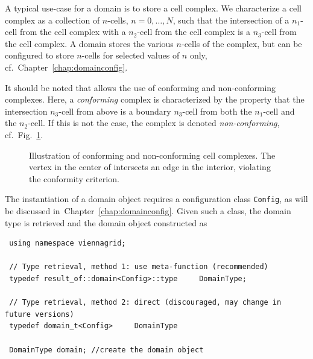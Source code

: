 A typical use-case for a domain is to store a cell complex. We characterize a cell complex as a collection of $n$-cells, $n=0, \ldots, N$, such that the intersection of a $n_1$-cell from the cell complex with a $n_2$-cell from the cell complex is a $n_3$-cell from the cell complex. A domain stores the various $n$-cells of the complex, but can be configured to store $n$-cells for selected values of $n$ only, cf.~Chapter~\ref{chap:domainconfig}.

It should be noted that {\ViennaGrid} allows the use of conforming and non-conforming complexes. Here, a \emph{conforming} complex is characterized by the property that the intersection $n_3$-cell from above is a boundary $n_3$-cell from both the $n_1$-cell and the $n_2$-cell. If this is not the case, the complex is denoted \emph{non-conforming}, cf.~Fig.~\ref{fig:conformity}.

\begin{figure}[tb]
\centering 
    \hspace*{2cm}
 \caption{Illustration of conforming and non-conforming cell complexes. The vertex in the center of  intersects an edge in the interior, violating the conformity criterion.}
 \label{fig:conformity}
\end{figure}

The instantiation of a {\ViennaGrid} domain object requires a configuration class \lstinline|Config|, as will be discussed in~Chapter~\ref{chap:domainconfig}. Given such a class, the domain type is retrieved and the domain object constructed as 
\begin{lstlisting}
 using namespace viennagrid;

 // Type retrieval, method 1: use meta-function (recommended)
 typedef result_of::domain<Config>::type     DomainType;

 // Type retrieval, method 2: direct (discouraged, may change in future versions)
 typedef domain_t<Config>     DomainType

 DomainType domain; //create the domain object
\end{lstlisting}

